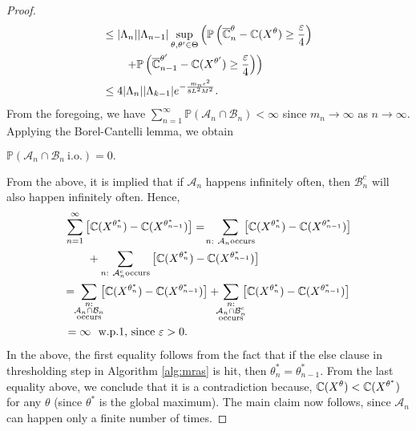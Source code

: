 \begin{proof}
\begin{align*}
&\leq |\Lambda_n||\Lambda_{n-1}|\sup_{\theta,\theta'\in \Theta}\left(\mathbb{P}\left(\overline {\mathbb{C}}_n^{\theta}-\mathbb{C}(X^{\theta})\geq \frac{\varepsilon}{4}\right)\right. \\
&\qquad\left. + \mathbb{P}\left(\overline {\mathbb{C}}_{n-1}^{\theta'}-\mathbb{C}(X^{\theta'})\geq \frac{\varepsilon}{4}\right)\right) \\
&\leq  4|\Lambda_n||\Lambda_{k-1}|
 e^{- \frac{m_n\epsilon^2}{8 L^2 M^2}}.
\end{align*}
From the foregoing, we have $\sum_{n=1}^{\infty}\mathbb{P}\left(\mathcal{A}_n \cap \mathcal{B}_n\right) < \infty$ since $m_n \rightarrow \infty$ as $n\rightarrow \infty$.  Applying the Borel-Cantelli lemma, we obtain\\
\centerline{$
\mathbb{P}\left(\mathcal{A}_n \cap \mathcal{B}_n~\mbox{i.o.} \right)=0.
$}

From the above, it is implied that if $\mathcal{A}_n$ happens infinitely often,
then $\mathcal{B}_n^c$ will also happen infinitely often. Hence,
\begin{align*}
&\sum_{n=1}^{\infty}\big[\C(X^{\theta^*_n})-\C(X^{\theta^*_{n-1}})\big] 
=\!\sum_{n:~\mathcal{A}_n \text{occurs}}\!\!\!\!\!\!\!\big[\C(X^{\theta^*_n})-\C(X^{\theta^*_{n-1}})\big]\\
&\qquad+\sum_{n:~\mathcal{A}_n^c \text{occurs}}\big[\C(X^{\theta^*_n})-\C(X^{\theta^*_{n-1}})\big] \\ 
&\!=\!\!\sum_{\substack{n:\\\mathcal{A}_n\cap \mathcal{B}_n\\ \text{occurs}}}\!\!\!\big[\C(X^{\theta^*_n})-\C(X^{\theta^*_{n-1}})\big] +\!\!\!\sum_{\substack{n:\\\mathcal{A}_n\cap \mathcal{B}_n^c\\ \text{occurs}}}\!\!\!\big[\C(X^{\theta^*_n})-\C(X^{\theta^*_{n-1}})\big] \\ 
&=\infty \text{~~w.p.1, since $\varepsilon>0$.}
\end{align*}
In the above, the first equality follows from the fact that if the else clause in thresholding step in Algorithm \ref{alg:mras} is hit, then $\theta^*_{n} = \theta^*_{n-1}$.
%
From the last equality above, we conclude that it is a contradiction because, $\mathbb{C}(X^{\theta}) < \mathbb{C}(X^{\theta^*})$ for any $\theta$ (since $\theta^*$ is the global maximum). The main claim now follows, since $\mathcal{A}_n$ can happen only a finite number of times.
\end{proof}

